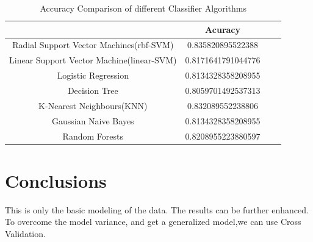 \begin{table}  \centering
  \caption{Accuracy Comparison of different Classifier Algorithms}
  \label{tbl:overall-experiments}
  \begin{tabular}{cccc}
\toprule
     & Acuracy \\
\midrule
    Radial Support Vector Machines(rbf-SVM)   & 0.835820895522388 \\
    Linear Support Vector Machine(linear-SVM) & 0.8171641791044776 \\
    Logistic Regression & 0.8134328358208955 \\
    Decision Tree & 0.8059701492537313 \\
    K-Nearest Neighbours(KNN) & 0.832089552238806 \\
    Gaussian Naive Bayes & 0.8134328358208955 \\
    Random Forests & 0.8208955223880597\\
\bottomrule
\end{tabular}
\end{table}

\section{Conclusions} \label{sec-conclusions}
This is only the basic modeling of the data. The results can be further enhanced. To overcome the model variance, and get a generalized model,we can use Cross Validation.



